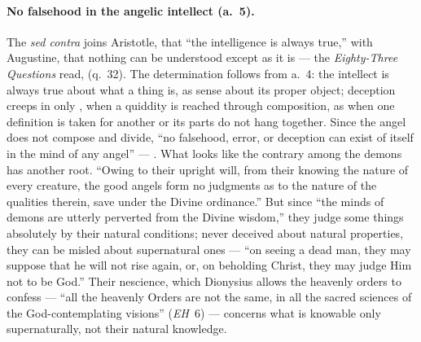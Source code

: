 \paragraph{No falsehood in the angelic intellect (a.~5).} The \emph{sed
contra} joins Aristotle, that ``the intelligence is always true,'' with
Augustine, that nothing can be understood except as it is --- the
\emph{Eighty-Three Questions} read,  (q.~32). The determination follows from a.~4: the
intellect is always true about what a thing is, as sense about its proper
object; deception creeps in only , when a quiddity is reached
through composition, as when one definition is taken for another or its
parts do not hang together. Since the angel does not compose and divide,
``no falsehood, error, or deception can exist of itself in the mind of any
angel'' --- . What looks like the contrary among the demons has another
root. ``Owing to their upright will, from their knowing the nature of
every creature, the good angels form no judgments as to the nature of the
qualities therein, save under the Divine ordinance.'' But since ``the
minds of demons are utterly perverted from the Divine wisdom,'' they
judge some things absolutely by their natural conditions; never deceived about natural
properties, they can be misled about supernatural ones --- ``on seeing a
dead man, they may suppose that he will not rise again, or, on beholding
Christ, they may judge Him not to be God.'' Their nescience, which
Dionysius allows the heavenly orders to confess --- ``all the heavenly
Orders are not the same, in all the sacred sciences of the
God-contemplating visions'' (\emph{EH}~6) --- concerns what is knowable
only supernaturally, not their natural knowledge.

